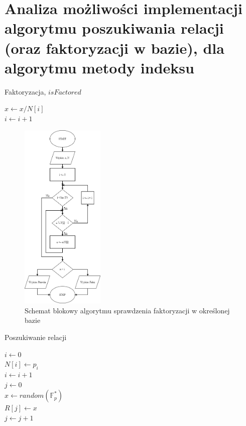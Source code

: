 \documentclass[]{article}
\begin{document}
\section{Analiza możliwości implementacji algorytmu poszukiwania relacji (oraz faktoryzacji w bazie), dla algorytmu metody indeksu}

\begin{algorithm}[H]
	\SetAlgoLined
	\caption{Faktoryzacja, \(isFactored\)}
	\label{Faktor}
	{
		{
			\(x \gets x/N[i]\)\\
		}
		\(i \gets i + 1\)
	}
	{
	}
\end{algorithm}

\begin{figure}[H]
	\begin{center}
		\includegraphics[width=4cm]{./img/3.png}
		\caption{Schemat blokowy algorytmu sprawdzenia faktoryzacji w określonej bazie}
	\end{center}
\end{figure}

\begin{algorithm}[H]
	\SetAlgoLined
	\caption{Poszukiwanie relacji}
	\label{Relation}
	\(i \gets 0\) \\
	{
		\(N[i] \gets p_i\)\\
		\(i \gets i + 1\)\\
	}
	\(j \gets 0\) \\
	{
		\(x \gets random(\mathbb{F}_p^*)\)\\
		{
			\(R[j] \gets x\)\\
			\(j \gets j + 1\)\\
		}
	}
\end{algorithm}
\end{document}
